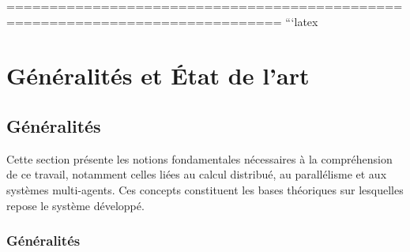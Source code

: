 \documentclass[12pt,a4paper]{report}
\begin{document}
\listoffigures

\listoftables
% 
==============================================================================
```latex
\chapter{Généralités et État de l’art}

\section{Généralités}

Cette section présente les notions fondamentales nécessaires à la compréhension de ce travail, notamment celles liées au calcul distribué, au parallélisme et aux systèmes multi-agents. Ces concepts constituent les bases théoriques sur lesquelles repose le système développé.

\subsection{Généralités}
\end{document}
